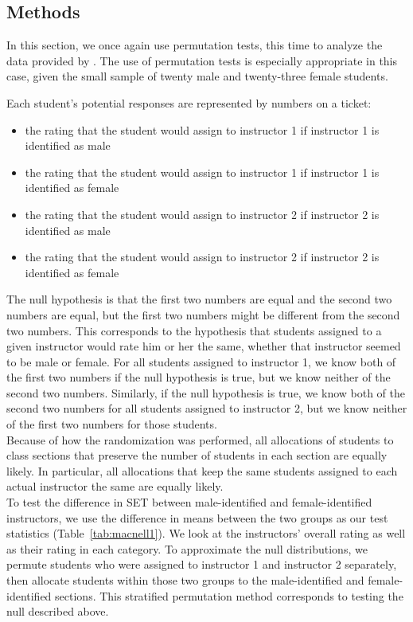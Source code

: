 \documentclass[12pt]{article}
\begin{document}
\subsection{Methods}\label{macnell:methods}
In this section, we once again use permutation tests, this time to analyze the data provided by \citet{MacNell2014}. The use of permutation tests is especially appropriate in this case, given the small sample of twenty male and twenty-three female students.

Each student's potential responses are represented by numbers on a ticket:
\begin{itemize}
\item the rating that the student would assign to instructor 1 if instructor 1 is identified as male
\item the rating that the student would assign to instructor 1 if instructor 1 is identified as female
\item the rating that the student would assign to instructor 2 if instructor 2 is identified as male
\item the rating that the student would assign to instructor 2 if instructor 2 is identified as female
\end{itemize}

The null hypothesis is that the first two numbers are equal and the second two numbers are equal, but the first two numbers might be different from the second two numbers. This corresponds to the hypothesis that students assigned to a given instructor would rate him or her the same, whether that instructor seemed to be male or female. For all students assigned to instructor 1, we know both of the first two numbers if the null hypothesis is true, but we know neither of the second two numbers. Similarly, if the null hypothesis is true, we know both of the second two numbers for all students assigned to instructor 2, but we know neither of the first two numbers for those students. \\

Because of how the randomization was performed, all allocations of students to class sections that preserve the number of students in each section are equally likely.  In particular, all allocations that keep the same students assigned to each actual instructor the same are equally likely.  \\

To test the difference in SET between male-identified and female-identified instructors, we use the difference in means between the two groups as our test statistics (Table~\ref{tab:macnell1}).  We look at the instructors' overall rating as well as their rating in each category.  To approximate the null distributions, we permute students who were assigned to instructor 1 and instructor 2 separately, then allocate students within those two groups to the male-identified and female-identified sections.  This stratified permutation method corresponds to testing the null described above. \\
\end{document}
